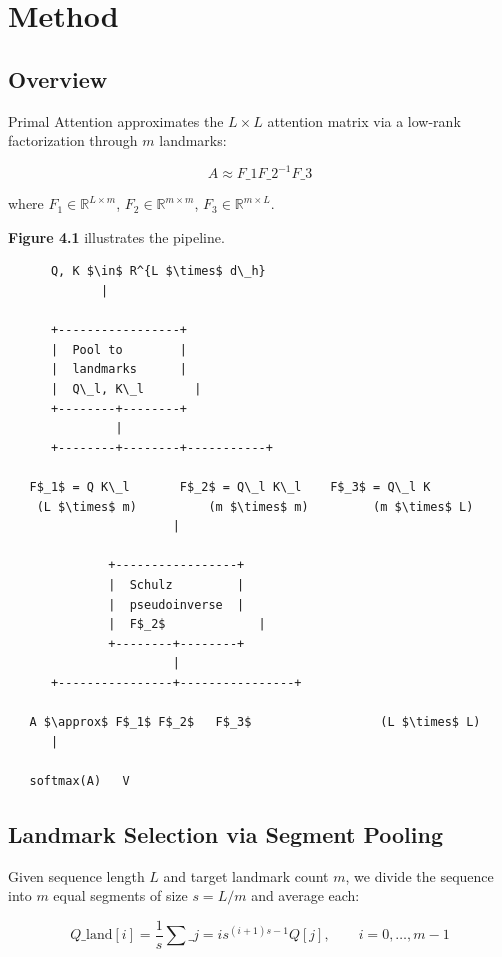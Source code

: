 
\section{Method}

\subsection{Overview}

Primal Attention approximates the $L \times L$ attention matrix via a 
low-rank factorization through $m$ landmarks:

\[
A \approx F\_1 F\_2^{-1} F\_3
\]

where $F_1 \in \mathbb{R}^{L \times m}$, $F_2 \in \mathbb{R}^{m \times m}$, 
$F_3 \in \mathbb{R}^{m \times L}$.

\textbf{Figure 4.1} illustrates the pipeline.

\begin{lstlisting}
      Q, K $\in$ R^{L $\times$ d\_h}
             |
              
      +-----------------+
      |  Pool to        |
      |  landmarks      |
      |  Q\_l, K\_l       |
      +--------+--------+
               |
      +--------+--------+-----------+
                                     
   F$_1$ = Q K\_l       F$_2$ = Q\_l K\_l    F$_3$ = Q\_l K 
    (L $\times$ m)          (m $\times$ m)         (m $\times$ L)
                       |
                        
              +-----------------+
              |  Schulz         |
              |  pseudoinverse  |
              |  F$_2$             |
              +--------+--------+
                       |
      +----------------+----------------+
                                         
   A $\approx$ F$_1$ F$_2$   F$_3$                  (L $\times$ L)
      |
       
   softmax(A)   V
\end{lstlisting}

\subsection{Landmark Selection via Segment Pooling}

Given sequence length $L$ and target landmark count $m$, we divide the 
sequence into $m$ equal segments of size $s = L / m$ and average each:

\[
Q\_\text{land}[i] = \frac{1}{s} \sum\_{j = i s}^{(i+1) s - 1} Q[j], \qquad i = 0, \ldots, m - 1
\]


